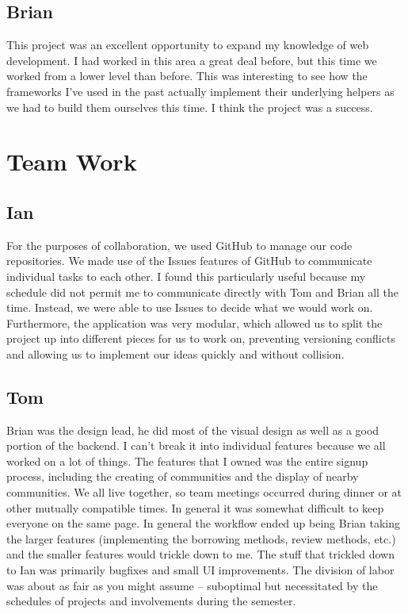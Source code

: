 \documentclass{acm_proc_article-sp}
\begin{document}
\subsection{Brian}
This project was an excellent opportunity to expand my knowledge of web development.  I had worked in this area a great deal before, but this time we worked from a lower level than before.  This was interesting to see how the frameworks I've used in the past actually implement their underlying helpers as we had to build them ourselves this time.  I think the project was a success.
\section{Team Work}
\subsection{Ian}
For the purposes of collaboration, we used GitHub to manage our code repositories. We made use of the Issues features of GitHub to communicate individual tasks to each other. I found this particularly useful because my schedule did not permit me to communicate directly with Tom and Brian all the time. Instead, we were able to use Issues to decide what we would work on. Furthermore, the application was very modular, which allowed us to split the project up into different pieces for us to work on, preventing versioning conflicts and allowing us to implement our ideas quickly and without collision.
\subsection{Tom}
Brian was the design lead, he did most of the visual design as well as a good portion of the backend. I can't break it into individual features because we all worked on a lot of things. The features that I owned was the entire signup process, including the creating of communities and the display of nearby communities.
We all live together, so team meetings occurred during dinner or at other mutually compatible times. In general it was somewhat difficult to keep everyone on the same page. In general the workflow ended up being Brian taking the larger features (implementing the borrowing methods, review methods, etc.) and the smaller features would trickle down to me. The stuff that trickled down to Ian was primarily bugfixes and small UI improvements.
The division of labor was about as fair as you might assume -- suboptimal but necessitated by the schedules of projects and involvements during the semester.
\end{document}
